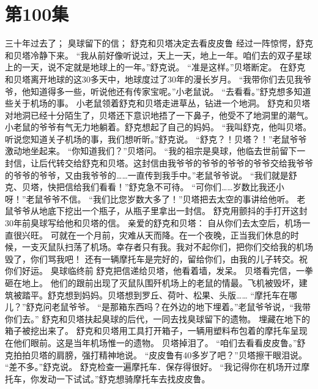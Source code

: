 \documentclass[a4paper,12pt,UTF8,twoside]{ctexbook}
\begin{document}
\chapter{第100集 }

        三十年过去了； 
        臭球留下的信； 
        舒克和贝塔决定去看皮皮鲁   
        经过一阵惊愕，舒克和贝塔冷静下来。 
        “我从前好像听说过，天上一天，地上一年。咱们去的双子星球上的一天，说不定就是地球上的一年。”舒克说。 
        “准是这样。”贝塔断定。 
        在舒克和贝塔离开地球的这30多天中，地球度过了30年的漫长岁月。 
        “我带你们去见我爷爷，他知道得多一些，听说他还有传家宝呢。”小老鼠说。 
        “去看看。”舒克想多知道些关于机场的事。 
        小老鼠领着舒克和贝塔走进草丛，钻进一个地洞。 
        舒克和贝塔对地洞已经十分陌生了，贝塔还下意识地捂了一下鼻子，他受不了地洞里的潮气。 
        小老鼠的爷爷有气无力地躺着。舒克想起了自己的妈妈。 
        “我叫舒克，他叫贝塔。听说您知道关子机场的事，我们想听昕。”舒克说。 
        “舒克？！贝塔？！”老鼠爷爷激动地坐起来。 
        “你知道我们？”贝塔问。 
        “我的祖宗是臭球，他临去世前留下一封信，让后代转交给舒克和贝塔。这封信由我爷爷的爷爷的爷爷的爷爷交给我爷爷的爷爷的爷爷，又由我爷爷的……一直传到我手中。”老鼠爷爷说。 
        “我们就是舒克、贝塔，快把信给我们看看！”舒克急不可待。 
        “可你们……岁数比我还小呀！”老鼠爷爷不信。 
        “我们比您岁数大多了！”贝塔把去太空的事讲给他听。 
        老鼠爷爷从地底下挖出一个瓶子，从瓶子里拿出一封信。 
        舒克用颤抖的手打开这封30年前臭球写给他和贝塔的信。 
        亲爱的舒克和贝塔： 
        自从你们去太空后，机场一直很兴旺。 
        可就在一个月前，灾难从天而降。在一个夜晚，正当我们休息的时候，一支灭鼠队扫荡了机场。幸存者只有我。我对不起你们，把你们交给我的机场毁了，你们骂我吧！ 
        还有一辆摩托车是完好的，留给你们，由我的儿子转交。祝你们好运。 
        臭球临终前 
        舒克把信递给贝塔，他看着墙，发呆。 
        贝塔看完信，一拳砸在地上。 
        他们的跟前出现了灭鼠队围歼机场上的老鼠的情最。飞机被毁坏，建筑被踏平。舒克想到妈妈。贝塔想到罗丘、荷叶、松果、头版…… 
        “摩托车在哪儿？”舒克问老鼠爷爷。 
        “是那箱东西吗？在外边的地下埋着。”老鼠爷爷说，“我带你们去。” 
        舒克和贝塔扶起臭球的后代，一同去找臭球留下的遗物。 
        埋藏在地下的箱子被挖出来了。 
        舒克和贝塔用工具打开箱子，一辆用塑料布包着的摩托车呈现在他们眼前。这是当年机场惟一的遗物。 
        贝塔掉泪了。 
        “咱们去看看皮皮鲁。”舒克拍拍贝塔的肩膀，强打精神地说。 
        “皮皮鲁有40多岁了吧？”贝塔擦干眼泪说。 
        “差不多。”舒克说。 
        舒克检查一遍摩托车．保存得很好。 
        “我记得你在机场开过摩托车，你发动一下试试。”舒克想骑摩托车去找皮皮鲁。 
\end{document}
